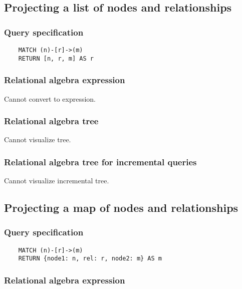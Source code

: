 	\subsection{Projecting a list of nodes and relationships}

	\subsubsection*{Query specification}

	\begin{lstlisting}
	MATCH (n)-[r]->(m)
	RETURN [n, r, m] AS r
	\end{lstlisting}


	\subsubsection*{Relational algebra expression}

	Cannot convert to expression.

	\subsubsection*{Relational algebra tree}

	Cannot visualize tree.

	\subsubsection*{Relational algebra tree for incremental queries}

	Cannot visualize incremental tree.
	\subsection{Projecting a map of nodes and relationships}

	\subsubsection*{Query specification}

	\begin{lstlisting}
	MATCH (n)-[r]->(m)
	RETURN {node1: n, rel: r, node2: m} AS m
	\end{lstlisting}


	\subsubsection*{Relational algebra expression}

